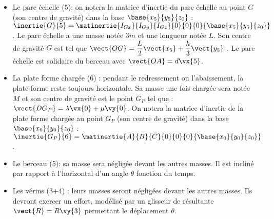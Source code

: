 \begin{itemize}
\item Le parc échelle (5): on notera la matrice d’inertie du parc échelle au point $G$ (son centre de gravité) dans la base $\base{x_5}{y_5}{z_0}$ :  $\inertie{G}{5} = \matinertie{I_{Gx}}{I_{Gy}}{I_{Gz}}{0}{0}{0}{\base{x_5}{y_5}{z_0}}$. 
Le parc échelle a une masse notée $3m$ et une longueur notée $L$.
 Son centre de gravité $G$ est tel que $\vect{OG}=\dfrac{L}{2}\vect{x_5} +\dfrac{h}{3}\vect{y_5} $ .
 Le parc échelle est solidaire du berceau avec $\vect{OA}=d\vx{5}$.
 
\item La plate forme chargée (6) : pendant le redressement ou l’abaissement, la plate-forme reste toujours horizontale. Sa masse une fois chargée sera notée $M$ et son centre de gravité est le point $G_P$ tel que :
$\vect{DG_P} = \lambda \vx{0} + \mu \vy{0}$. On notera la matrice d’inertie de la plate forme chargée au point $G_P$ (son centre de gravité) dans la base $\base{x_0}{y_0}{z_0}$ : $\inertie{G_P}{6} = \matinertie{A}{B}{C}{0}{0}{0}{\base{x_0}{y_0}{z_0}}$.

\item  Le berceau (5): sa masse sera négligée devant les autres masses. Il est incliné par rapport à l’horizontal d’un angle $\theta$ fonction du temps.

\item Les vérins (3+4) : leurs masses seront négligées devant les autres masses.  Ils devront exercer un effort, modélisé par un glisseur de résultante $\vect{R}=R\vy{3}$ permettant le déplacement $\theta$.
 \end{itemize}

\ifprof
\begin{corrige}
\end{corrige}
\else
\fi


\ifprof
\begin{corrige}
\end{corrige}
\else
\fi


\ifprof
\begin{corrige}
\end{corrige}
\else
\fi


\question{}
\ifprof
\begin{corrige}
\end{corrige}
\else
\fi